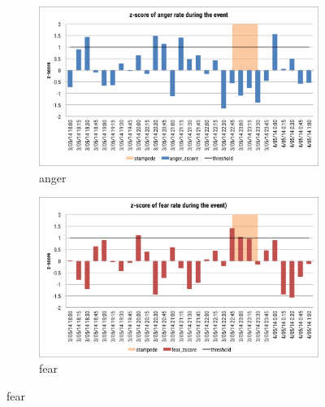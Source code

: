 \begin{figure}[htb!] 
\centering   
\begin{subfigure}{0.5\textwidth}
\centering    
\includegraphics[width=0.99\linewidth]{AngerZscoreEvent}
\caption{anger}
\label{fig:angerZscoreEvent}
\end{subfigure}%
\begin{subfigure}{0.5\textwidth}
\centering    
\includegraphics[width=0.99\linewidth]{FearZscoreEvent}
\caption{fear}
\label{fig:fearZscoreEvent}
\end{subfigure}


\end{figure}

